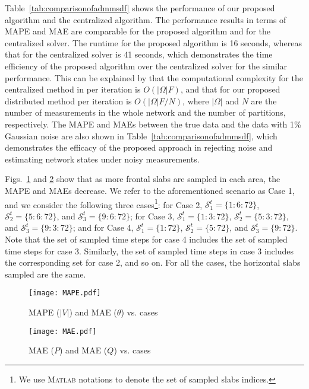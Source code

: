 \documentclass[journal]{IEEEtran}
\newcounter{propose}
\newcounter{thm}
\newcommand{\MATLAB}{\textsc{Matlab}\xspace}
\newcommand{\rev}[1]{{\color{black} #1}} %
\begin{document}
Table~\ref{tab:comparisonofadmmsdf} shows the performance of our proposed algorithm and the centralized algorithm. The performance results in terms of MAPE and MAE  are comparable for the proposed algorithm and for the centralized solver. The runtime for the proposed algorithm is 16 seconds, whereas that for the centralized solver is
41 seconds, which demonstrates the time efficiency of the proposed algorithm over the centralized solver for the similar performance. \rev{
This can be explained by that the computational complexity for the centralized method in \cite{Zamzam2020} per iteration is ${O}({|\Omega|F})$, and that for our proposed distributed method per iteration is ${O}({{|\Omega|}F/N})$, where $|\Omega|$  and $N$ are the number of measurements in the whole network and the number of partitions, respectively.} The MAPE and MAEs between the true data and the data with 1\% Gaussian noise are also shown in Table~\ref{tab:comparisonofadmmsdf}, which demonstrates the efficacy of the proposed approach in rejecting noise and estimating network states under noisy measurements.

Figs.~\ref{fig:slabsampling1} and \ref{fig:slabsampling2} show that as more frontal slabs are sampled in each area, the MAPE and MAEs decrease. We refer to the aforementioned scenario as Case 1, and we consider the following three cases\footnote{We use \MATLAB notations to denote the set of sampled slabs indices.}:
for Case 2,  $\mathcal{S}_1^t=\{1:6:72\}$, $\mathcal{S}_2^t=\{5:6:72\}$, and $\mathcal{S}_3^t=\{9:6:72\}$; for Case 3, 
$\mathcal{S}_1^t=\{1:3:72\}$, $\mathcal{S}_2^t=\{5:3:72\}$, and $\mathcal{S}_3^t=\{9:3:72\}$; and for Case 4, 
$\mathcal{S}_1^t=\{1:72\}$, $\mathcal{S}_2^t=\{5:72\}$, and $\mathcal{S}_3^t=\{9:72\}$.
Note that the set of sampled time steps for case 4 includes the set of sampled time steps for case 3. Similarly, the set of sampled time steps in case 3  includes the corresponding set for case 2, and so on. For all the cases, the horizontal slabs sampled are the same.


\begin{figure}
    \centering
   \texttt{[image: MAPE.pdf]}
    \caption{MAPE ($|V|$) and MAE ($\theta$) vs. cases}
     \label{fig:slabsampling1}
 \end{figure}
 \begin{figure}
     \centering
   \texttt{[image: MAE.pdf]}
     \caption{MAE ($P$) and MAE ($Q$) vs. cases}
    \label{fig:slabsampling2}
 \end{figure}
\end{document}

